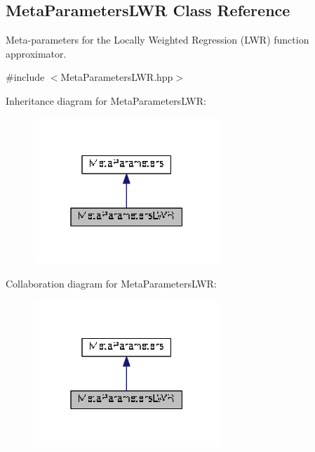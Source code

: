 \hypertarget{classDmpBbo_1_1MetaParametersLWR}{\subsection{Meta\+Parameters\+L\+W\+R Class Reference}
\label{classDmpBbo_1_1MetaParametersLWR}
}


Meta-\/parameters for the Locally Weighted Regression (L\+W\+R) function approximator.  




{\ttfamily \#include $<$Meta\+Parameters\+L\+W\+R.\+hpp$>$}



Inheritance diagram for Meta\+Parameters\+L\+W\+R\+:
\nopagebreak
\begin{figure}[H]
\begin{center}
\leavevmode
\includegraphics[width=199pt]{classDmpBbo_1_1MetaParametersLWR__inherit__graph}
\end{center}
\end{figure}


Collaboration diagram for Meta\+Parameters\+L\+W\+R\+:
\nopagebreak
\begin{figure}[H]
\begin{center}
\leavevmode
\includegraphics[width=199pt]{classDmpBbo_1_1MetaParametersLWR__coll__graph}
\end{center}
\end{figure}
